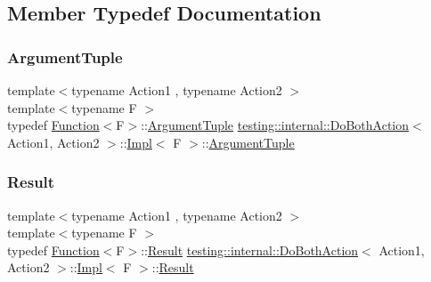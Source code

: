 \subsection{Member Typedef Documentation}
\mbox{\label{classtesting_1_1internal_1_1_do_both_action_1_1_impl_a2cd808bf132e28d3df7d59d23c19f273}} 
\subsubsection{\texorpdfstring{ArgumentTuple}{ArgumentTuple}}
{\footnotesize\ttfamily template$<$typename Action1 , typename Action2 $>$ \\
template$<$typename F $>$ \\
typedef \mbox{\hyperlink{structtesting_1_1internal_1_1_function}{Function}}$<$F$>$\+::\mbox{\hyperlink{classtesting_1_1_action_interface_af72720d864da4d606629e83edc003511}{Argument\+Tuple}} \mbox{\hyperlink{classtesting_1_1internal_1_1_do_both_action}{testing\+::internal\+::\+Do\+Both\+Action}}$<$ Action1, Action2 $>$\+::\mbox{\hyperlink{classtesting_1_1internal_1_1_do_both_action_1_1_impl}{Impl}}$<$ F $>$\+::\mbox{\hyperlink{classtesting_1_1_action_interface_af72720d864da4d606629e83edc003511}{Argument\+Tuple}}}

\mbox{\label{classtesting_1_1internal_1_1_do_both_action_1_1_impl_a90f9878e3c1db37a688b6e0c4c29c17d}} 
\subsubsection{\texorpdfstring{Result}{Result}}
{\footnotesize\ttfamily template$<$typename Action1 , typename Action2 $>$ \\
template$<$typename F $>$ \\
typedef \mbox{\hyperlink{structtesting_1_1internal_1_1_function}{Function}}$<$F$>$\+::\mbox{\hyperlink{classtesting_1_1_action_interface_a7477de2fe3e4e01c59db698203acaee7}{Result}} \mbox{\hyperlink{classtesting_1_1internal_1_1_do_both_action}{testing\+::internal\+::\+Do\+Both\+Action}}$<$ Action1, Action2 $>$\+::\mbox{\hyperlink{classtesting_1_1internal_1_1_do_both_action_1_1_impl}{Impl}}$<$ F $>$\+::\mbox{\hyperlink{classtesting_1_1_action_interface_a7477de2fe3e4e01c59db698203acaee7}{Result}}}

